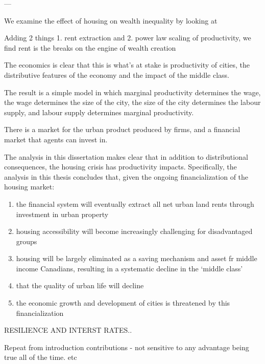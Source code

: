 ---


We examine the effect of housing on wealth inequality by looking at 

Adding 2 things 1. rent extraction and 2. power law scaling of productivity, we find rent is the breaks on the engine of wealth creation

The economics is clear that this is what's at stake is productivity of cities, the distributive features of the economy and the impact of the middle class.

The result is a simple model in which marginal productivity determines the wage, the wage determines the size of the city, the size of the city determines the labour supply, and labour supply determines marginal productivity. 

There is a market for the urban product produced by firms, and a financial market that agents can invest in.


The analysis in this dissertation makes clear that in addition to distributional consequences, the housing crisis has productivity impacts. Specifically, the analysis in this thesis concludes that, given the ongoing financialization of the housing market:

\begin{enumerate}
\item the financial system will eventually extract all net urban land rents through investment in urban property
\item housing accessibility will become increasingly challenging for disadvantaged groups
\item housing will be largely eliminated as a saving mechanism and asset fr middle income Canadians,  resulting in a systematic decline in the `middle class'
\item that the quality of urban life will decline
\item the economic growth and development of cities is threatened by this financialization
\end{enumerate}

RESILIENCE AND INTERST RATES..


Repeat from introduction contributions
- not sensitive to any advantage being true all of the time. etc